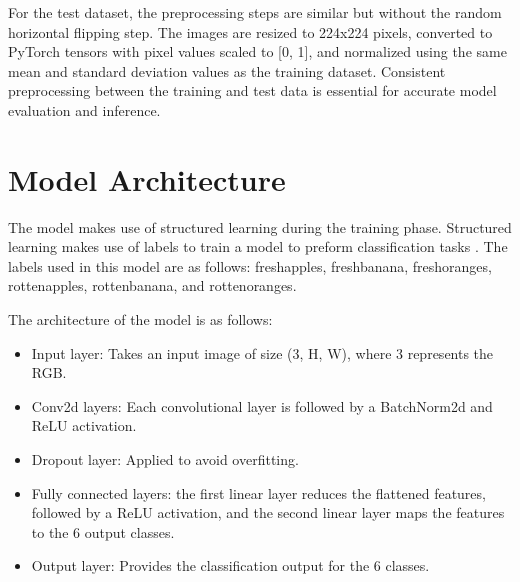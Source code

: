 \documentclass[conference]{IEEEtran}
\begin{document}
For the test dataset, the preprocessing steps are similar but without the random horizontal flipping step. The images are resized to 224x224 pixels, converted to PyTorch tensors with pixel values scaled to [0, 1], and normalized using the same mean and standard deviation values as the training dataset. Consistent preprocessing between the training and test data is essential for accurate model evaluation and inference.

\section{Model Architecture}

The model makes use of structured learning during the training phase. Structured learning makes use of labels to train a model to preform classification tasks \cite{b1}. The labels used in this model are as follows: freshapples, freshbanana, freshoranges, rottenapples, rottenbanana, and rottenoranges.

The architecture of the model is as follows:
\begin{itemize}
    \item Input layer: Takes an input image of size (3, H, W), where 3 represents the RGB.
    \item Conv2d layers: Each convolutional layer is followed by a BatchNorm2d and ReLU activation.
    \item Dropout layer: Applied to avoid overfitting.
    \item Fully connected layers: the first linear layer reduces the flattened features, followed by a ReLU activation, and the second linear layer maps the features to the 6 output classes.
    \item Output layer: Provides the classification output for the 6 classes.
\end{itemize}
\end{document}

